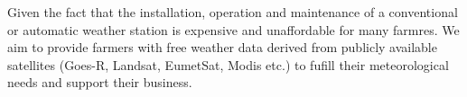 Given the fact that the installation, operation and maintenance of a conventional or automatic weather station is expensive and unaffordable
for many farmres. We aim to provide farmers with free weather data derived from publicly available satellites (Goes-R, Landsat, EumetSat, Modis etc.) 
to fufill their meteorological needs and support their business.
